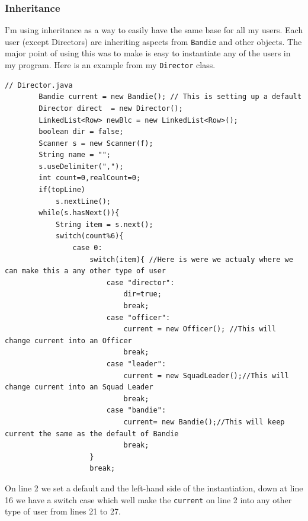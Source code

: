 \documentclass{article}
\begin{document}
\subsubsection{Inheritance}
I'm using inheritance as a way to easily have the same base for all my users. Each user (except Directors) are inheriting aspects from \verb|Bandie| and other objects. The major point of using this was to make is easy to instantiate any of the users in my program. Here is an example from my \verb|Director| class.
\begin{lstlisting}
// Director.java
		Bandie current = new Bandie(); // This is setting up a default
		Director direct  = new Director();
		LinkedList<Row> newBlc = new LinkedList<Row>();
		boolean dir = false;
		Scanner s = new Scanner(f);
		String name = "";
		s.useDelimiter(",");
		int count=0,realCount=0;
		if(topLine)
			s.nextLine();
		while(s.hasNext()){
			String item = s.next();
			switch(count%6){
				case 0:
					switch(item){ //Here is were we actualy where we can make this a any other type of user
						case "director":
							dir=true;
							break;
						case "officer":
							current = new Officer(); //This will change current into an Officer
							break;
						case "leader":
							current = new SquadLeader();//This will change current into an Squad Leader
							break;
						case "bandie":
							current= new Bandie();//This will keep current the same as the default of Bandie
							break;
					}
					break;
\end{lstlisting}
On line 2 we set a default and the left-hand side of the instantiation, down at line 16 we have a switch case which well make the \verb|current| on line 2 into any other type of user from lines 21 to 27. 
\end{document}
